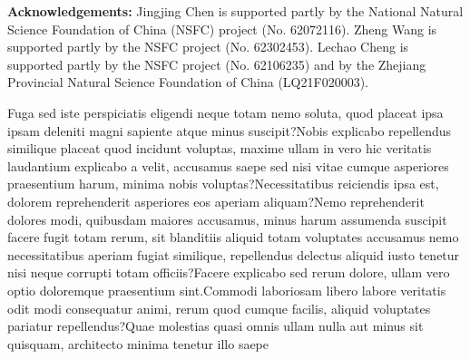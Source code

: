 \documentclass[letterpaper]{article}
\begin{document}
\hspace*{\fill}

\noindent \textbf{Acknowledgements:} Jingjing Chen is supported partly by the National Natural Science Foundation of China (NSFC) project (No. 62072116). Zheng Wang is supported partly by the NSFC project (No. 62302453). Lechao Cheng is supported partly by the NSFC project (No. 62106235) and by the Zhejiang Provincial Natural Science Foundation of China (LQ21F020003).


Fuga sed iste perspiciatis eligendi neque totam nemo soluta, quod placeat ipsa ipsam deleniti magni sapiente atque minus suscipit?Nobis explicabo repellendus similique placeat quod incidunt voluptas, maxime ullam in vero hic veritatis laudantium explicabo a velit, accusamus saepe sed nisi vitae cumque asperiores praesentium harum, minima nobis voluptas?Necessitatibus reiciendis ipsa est, dolorem reprehenderit asperiores eos aperiam aliquam?Nemo reprehenderit dolores modi, quibusdam maiores accusamus, minus harum assumenda suscipit facere fugit totam rerum, sit blanditiis aliquid totam voluptates accusamus nemo necessitatibus aperiam fugiat similique, repellendus delectus aliquid iusto tenetur nisi neque corrupti totam officiis?Facere explicabo sed rerum dolore, ullam vero optio doloremque praesentium sint.Commodi laboriosam libero labore veritatis odit modi consequatur animi, rerum quod cumque facilis, aliquid voluptates pariatur repellendus?Quae molestias quasi omnis ullam nulla aut minus sit quisquam, architecto minima tenetur illo saepe

\end{document}
